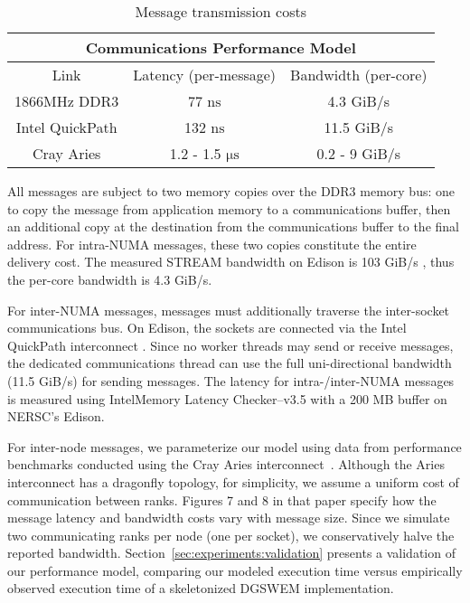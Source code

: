 \begin{table}
  \caption{Message transmission costs}
  \label{tab:comm-model}
  \footnotesize
  \begin{center}
    \begin{tabular}{|c|c|c|}
      \hline
      \multicolumn{3}{|c|}{Communications Performance Model} \\
      \hline
      Link & Latency (per-message) & Bandwidth (per-core) \\
      \hline
      1866MHz DDR3 & 77 $\mathrm{ns}$ & 4.3 GiB/s \\
      \hline
      Intel QuickPath & 132 $\mathrm{ns}$ & 11.5 GiB/s \\
      \hline
      Cray Aries & 1.2 - 1.5 $\mathrm{\mu s}$ & 0.2 - 9 GiB/s \\
      \hline
    \end{tabular}
  \end{center}
  \vspace{-5mm}
\end{table}

All messages are subject to two memory copies over the DDR3 memory bus:
one to copy the message from application memory to a communications buffer,
then an additional copy at the destination from the communications buffer to the final address.
For intra-NUMA messages, these two copies constitute the entire
delivery cost.
The measured STREAM bandwidth on Edison is 103 GiB/s
\cite{edison-config}, thus the per-core bandwidth is 4.3 GiB/s.

For inter-NUMA messages, messages must additionally traverse the
inter-socket communications bus.
On Edison, the sockets are connected via the Intel QuickPath interconnect
\cite{intel-qp-whitepaper}.
Since no worker threads may send or receive messages, the dedicated communications
thread can use the full uni-directional bandwidth (11.5 GiB/s) for sending
messages.
The latency for intra-/inter-NUMA messages is measured using Intel\textregistered Memory Latency Checker--v3.5 with a 200 MB buffer on NERSC's Edison.

For inter-node messages, we parameterize our model using data from
performance benchmarks conducted using the
Cray Aries interconnect~\cite{Faanes:2012:cascade}.
Although the Aries interconnect has a dragonfly topology, for simplicity, we
assume a uniform cost of communication between ranks.
Figures 7 and 8 in that paper specify how the message latency and
bandwidth costs vary with message size.
Since we simulate two communicating ranks per node (one
per socket), we conservatively halve the reported bandwidth.
Section~\ref{sec:experiments:validation} presents a validation of our
performance model, comparing our modeled execution time versus
empirically observed execution time of a skeletonized DGSWEM implementation.
